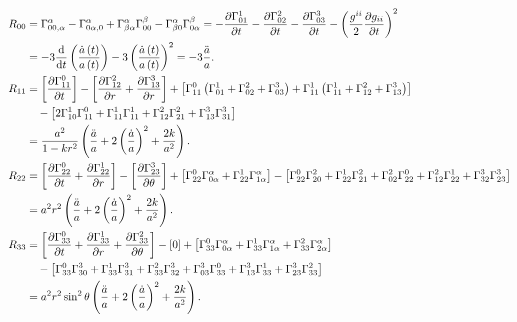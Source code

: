 \documentclass[../天体物理基础.tex]{subfiles}
\begin{document}
\begin{align}
R_{00}&=\Gamma_{00,\alpha}^{\alpha}-\Gamma_{0\alpha,0}^{\alpha}+\Gamma_{\beta\alpha}^{\alpha}\Gamma_{00}^{\beta}-\Gamma_{\beta0}^{\alpha}\Gamma_{0\alpha}^{\beta}=-\frac{\partial{}\Gamma_{01}^{1}}{\partial{}t}-\frac{\partial{}\Gamma_{02}^{2}}{\partial{}t}-\frac{\partial{}\Gamma_{03}^{3}}{\partial{}t}-\left(\frac{g^{ii}}{2}\frac{\partial{}g_{ii}}{\partial{}t}\right)^{2}\notag\\
&=-3\frac{\mathrm{d}}{\mathrm{d}t}\left(\frac{\dot{a}\left(t\right)}{a\left(t\right)}\right)-3\left(\frac{\dot{a}\left(t\right)}{a\left(t\right)}\right)^{2}=-3\frac{\ddot{a}}{a}.\notag\\
R_{11}&=\left[\frac{\partial{}\Gamma_{11}^{0}}{\partial{}t}\right]-\left[\frac{\partial{}\Gamma_{12}^{2}}{\partial{}r}+\frac{\partial{}\Gamma_{13}^{3}}{\partial{}r}\right]+\left[\Gamma_{11}^{0}\left(\Gamma_{01}^{1}+\Gamma_{02}^{2}+\Gamma_{03}^{3}\right)+\Gamma_{11}^{1}\left(\Gamma_{11}^{1}+\Gamma_{12}^{2}+\Gamma_{13}^{3}\right)\right]\notag\\
&\quad-\left[2\Gamma_{10}^{1}\Gamma_{11}^{0}+\Gamma_{11}^{1}\Gamma_{11}^{1}+\Gamma_{12}^{2}\Gamma_{21}^{2}+\Gamma_{13}^{3}\Gamma_{31}^{3}\right]\notag\\
&=\frac{a^{2}}{1-kr^{2}}\left(\frac{\ddot a}{a}+2\left(\frac{\dot{a}}{a}\right)^{2}+\frac{2k}{a^{2}}\right).\notag\\
R_{22}&=\left[\frac{\partial{}\Gamma_{22}^{0}}{\partial{}t}+\frac{\partial{}\Gamma_{22}^{1}}{\partial{}r}\right]-\left[\frac{\partial{}\Gamma_{23}^{3}}{\partial{}\theta}\right]+\left[\Gamma_{22}^{0}\Gamma_{0\alpha}^{\alpha}+\Gamma_{22}^{1}\Gamma_{1\alpha}^{\alpha}\right]-\left[\Gamma_{22}^{0}\Gamma_{20}^{2}+\Gamma_{22}^{1}\Gamma_{21}^{2}+\Gamma_{02}^{2}\Gamma_{22}^{0}+\Gamma_{12}^{2}\Gamma_{22}^{1}+\Gamma_{32}^{3}\Gamma_{23}^{3}\right]\notag\\
&=a^{2}r^{2}\left(\frac{\ddot{a}}{a}+2\left(\frac{\dot{a}}{a}\right)^{2}+\frac{2k}{a^{2}}\right).\notag\\
R_{33}&=\left[\frac{\partial{}\Gamma_{33}^{0}}{\partial{}t}+\frac{\partial{}\Gamma_{33}^{1}}{\partial{}r}+\frac{\partial{}\Gamma_{33}^{2}}{\partial{}\theta}\right]-\left[0\right]+\left[\Gamma_{33}^{0}\Gamma_{0\alpha}^{\alpha}+\Gamma_{33}^{1}\Gamma_{1\alpha}^{\alpha}+\Gamma_{33}^{2}\Gamma_{2\alpha}^{\alpha}\right]\notag\\
&\quad-\left[\Gamma_{33}^{0}\Gamma_{30}^{3}+\Gamma_{33}^{1}\Gamma_{31}^{3}+\Gamma_{33}^{2}\Gamma_{32}^{3}+\Gamma_{03}^{3}\Gamma_{33}^{0}+\Gamma_{13}^{3}\Gamma_{33}^{1}+\Gamma_{23}^{3}\Gamma_{33}^{2}\right]\notag\\
&=a^{2}r^{2}\sin^{2}\theta\left(\frac{\ddot a}{a}+2\left(\frac{\dot a}{a}\right)^{2}+\frac{2k}{a^{2}}\right).\notag
\end{align}
\end{document}
